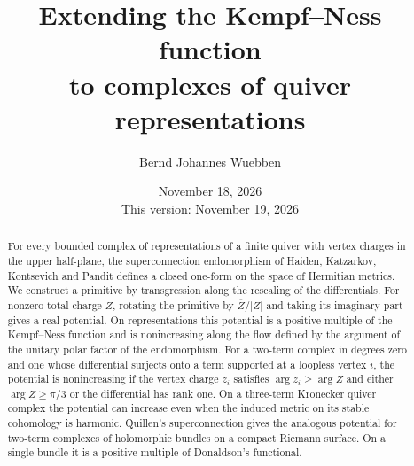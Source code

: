 \documentclass[11pt]{amsart}
\title[Extending the Kempf--Ness function to complexes]{Extending the
Kempf--Ness function\\ to complexes of quiver representations}
\author{Bernd Johannes Wuebben}
\date{November 18, 2026\\This version: November 19, 2026}
\theoremstyle{definition}
\theoremstyle{remark}
\begin{document}
\begin{abstract}
For every bounded complex of representations of a finite quiver with vertex
charges in the upper half-plane, the superconnection endomorphism of Haiden,
Katzarkov, Kontsevich and Pandit defines a closed one-form on the space of
Hermitian metrics. We construct a primitive by transgression along the
rescaling of the differentials. For nonzero total charge $Z$, rotating the
primitive by $\overline Z/|Z|$ and taking its imaginary part gives a real
potential. On representations this potential is a positive multiple of the
Kempf--Ness function and is nonincreasing along the flow defined by the
argument of the unitary polar factor of the endomorphism. For a two-term
complex in degrees zero and one whose differential surjects onto a term
supported at a loopless vertex $i$, the potential is nonincreasing if the
vertex charge $z_i$ satisfies $\arg z_i\geq\arg Z$ and either
$\arg Z\geq \pi/3$ or the differential has rank one. On a three-term
Kronecker quiver complex the potential can increase even when the induced
metric on its stable cohomology is harmonic. Quillen's superconnection
gives the analogous potential for two-term complexes of holomorphic bundles
on a compact Riemann surface. On a single bundle it is a positive multiple
of Donaldson's functional.
\end{abstract}
\maketitle









\end{document}

